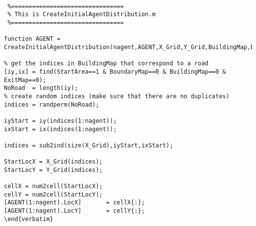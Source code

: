 \lstset{basicstyle=\footnotesize\ttfamily}
    
    \begin{lstlisting}[breaklines]
    
 %================================
 % This is CreateInitialAgentDistribution.m
 %================================
    
function AGENT = CreateInitialAgentDistribution(nagent,AGENT,X_Grid,Y_Grid,BuildingMap,BoundaryMap,StartArea,ExitMap)

% get the indices in BuildingMap that correspond to a road
[iy,ix] = find(StartArea==1 & BoundaryMap==0 & BuildingMap==0 & ExitMap==0);
NoRoad  = length(iy);
% create random indices (make sure that there are no duplicates)
indices = randperm(NoRoad);

iyStart = iy(indices(1:nagent));
ixStart = ix(indices(1:nagent));

indices = sub2ind(size(X_Grid),iyStart,ixStart);

StartLocX = X_Grid(indices);
StartLocY = Y_Grid(indices);

cellX = num2cell(StartLocX);
cellY = num2cell(StartLocY);
[AGENT(1:nagent).LocX]       = cellX{:};
[AGENT(1:nagent).LocY]       = cellY{:};
\end{verbatim}



\end{lstlisting}
    
